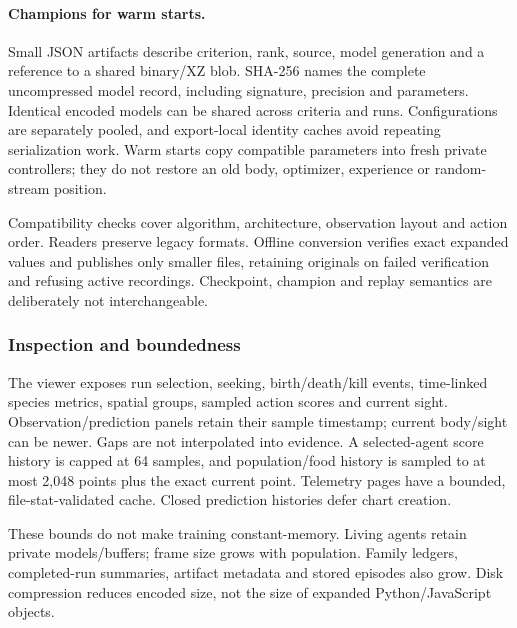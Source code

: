 \paragraph{Champions for warm starts.}
Small JSON artifacts describe criterion, rank, source, model generation and a
reference to a shared binary/XZ blob. SHA-256 names the complete uncompressed
model record, including signature, precision and parameters. Identical encoded
models can be shared across criteria and runs. Configurations are separately
pooled, and export-local identity caches avoid repeating serialization work.
Warm starts copy compatible parameters into fresh private controllers; they do
not restore an old body, optimizer, experience or random-stream position.

Compatibility checks cover algorithm, architecture, observation layout and
action order. Readers preserve legacy formats. Offline conversion verifies exact
expanded values and publishes only smaller files, retaining originals on failed
verification and refusing active recordings. Checkpoint, champion and replay
semantics are deliberately not interchangeable.

\subsubsection{Inspection and boundedness}
The viewer exposes run selection, seeking, birth/death/kill events, time-linked
species metrics, spatial groups, sampled action scores and current sight.
Observation/prediction panels retain their sample timestamp; current body/sight
can be newer. Gaps are not interpolated into evidence. A selected-agent score
history is capped at 64 samples, and population/food history is sampled to at
most 2,048 points plus the exact current point. Telemetry pages have a bounded,
file-stat-validated cache. Closed prediction histories defer chart creation.

These bounds do not make training constant-memory. Living agents retain private
models/buffers; frame size grows with population. Family ledgers, completed-run
summaries, artifact metadata and stored episodes also grow. Disk compression
reduces encoded size, not the size of expanded Python/JavaScript objects.
